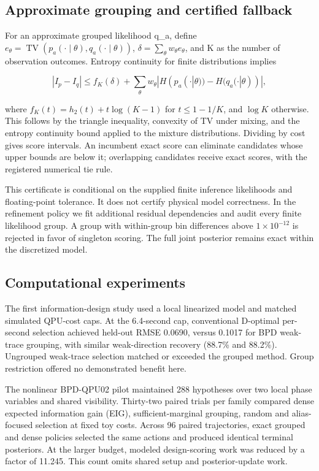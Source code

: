 \documentclass[11pt,a4paper]{article}
\begin{document}
\subsection{Approximate grouping and certified fallback}

For an approximate grouped likelihood q\_a, define $e_\theta=\operatorname{TV}(p_a(\cdot\mid\theta),q_a(\cdot\mid\theta))$, $\delta=\sum_\theta w_\theta e_\theta$, and K as the number of observation outcomes. Entropy continuity for finite distributions \cite{ref9} implies

\[
|I_p-I_q|\le f_K(\delta)+
\sum_\theta w_\theta|H(p_a(\cdot|\theta))-H(q_a(\cdot|\theta))|,
\]

where $f_K(t)=h_2(t)+t\log(K-1)$ for $t\le 1-1/K$, and $\log K$ otherwise. This follows by the triangle inequality, convexity of TV under mixing, and the entropy continuity bound applied to the mixture distributions. Dividing by cost gives score intervals. An incumbent exact score can eliminate candidates whose upper bounds are below it; overlapping candidates receive exact scores, with the registered numerical tie rule.

This certificate is conditional on the supplied finite inference likelihoods and floating-point tolerance. It does not certify physical model correctness. In the refinement policy we fit additional residual dependencies and audit every finite likelihood group. A group with within-group bin differences above $1\times10^{-12}$ is rejected in favor of singleton scoring. The full joint posterior remains exact within the discretized model.

\subsection{Computational experiments}

The first information-design study used a local linearized model and matched simulated QPU-cost caps. At the 6.4-second cap, conventional D-optimal per-second selection achieved held-out RMSE 0.0690, versus 0.1017 for BPD weak-trace grouping, with similar weak-direction recovery (88.7\% and 88.2\%). Ungrouped weak-trace selection matched or exceeded the grouped method. Group restriction offered no demonstrated benefit here.

The nonlinear BPD-QPU02 pilot maintained 288 hypotheses over two local phase variables and shared visibility. Thirty-two paired trials per family compared dense expected information gain (EIG), sufficient-marginal grouping, random and alias-focused selection at fixed toy costs. Across 96 paired trajectories, exact grouped and dense policies selected the same actions and produced identical terminal posteriors. At the larger budget, modeled design-scoring work was reduced by a factor of 11.245. This count omits shared setup and posterior-update work.
\end{document}
